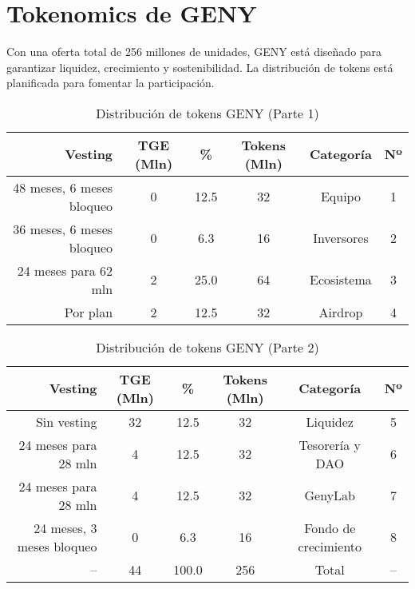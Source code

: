\documentclass[a4paper,12pt,openany]{book}
\begin{document}
\section*{Tokenomics de GENY}
Con una oferta total de 256 millones de unidades, GENY está diseñado para garantizar liquidez, crecimiento y sostenibilidad. La distribución de tokens está planificada para fomentar la participación.

\begin{table}[h]
\centering
\caption{Distribución de tokens GENY (Parte 1)}
\small
\begin{tabular}{r c c c c c}
\hline
\textbf{Vesting} & \textbf{TGE (Mln)} & \textbf{\%} & \textbf{Tokens (Mln)} & \textbf{Categoría} & \textbf{Nº} \\
\hline
48 meses, 6 meses bloqueo & 0 & 12.5 & 32 & Equipo & 1 \\
36 meses, 6 meses bloqueo & 0 & 6.3 & 16 & Inversores & 2 \\
24 meses para 62 mln & 2 & 25.0 & 64 & Ecosistema & 3 \\
Por plan & 2 & 12.5 & 32 & Airdrop & 4 \\
\hline
\end{tabular}
\end{table}

\begin{table}[h]
\centering
\caption{Distribución de tokens GENY (Parte 2)}
\small
\begin{tabular}{r c c c c c}
\hline
\textbf{Vesting} & \textbf{TGE (Mln)} & \textbf{\%} & \textbf{Tokens (Mln)} & \textbf{Categoría} & \textbf{Nº} \\
\hline
Sin vesting & 32 & 12.5 & 32 & Liquidez & 5 \\
24 meses para 28 mln & 4 & 12.5 & 32 & Tesorería y DAO & 6 \\
24 meses para 28 mln & 4 & 12.5 & 32 & GenyLab & 7 \\
24 meses, 3 meses bloqueo & 0 & 6.3 & 16 & Fondo de crecimiento & 8 \\
\hline
-- & 44 & 100.0 & 256 & Total & -- \\
\hline
\end{tabular}
\end{table}
\end{document}
